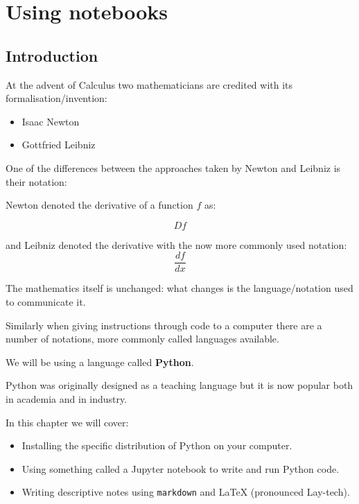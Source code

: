 \chapter{Using notebooks}
\label{\detokenize{tools-for-mathematics/01-using-notebooks/introduction/main:using-notebooks}}\label{\detokenize{tools-for-mathematics/01-using-notebooks/introduction/main:id1}}\label{\detokenize{tools-for-mathematics/01-using-notebooks/introduction/main::doc}}

\section{Introduction}
At the advent of Calculus two mathematicians are credited with its
formalisation/invention:
\begin{itemize}
\item Isaac Newton
\item Gottfried Leibniz
\end{itemize}

One of the differences between the approaches taken by Newton and Leibniz is
their notation:

Newton denoted the derivative of a function \(f\) as:

\begin{equation*}
Df
\end{equation*}

and Leibniz denoted the derivative with the now more commonly used notation:
\begin{equation*}
\frac{df}{dx}
\end{equation*}

The mathematics itself is unchanged: what changes is the language/notation used
to communicate it.

Similarly when giving instructions through code to a computer there are a number
of notations, more commonly called languages available.

We will be using a language called \textbf{Python}.

Python was originally designed as a teaching language but it is now popular both
in academia and in industry.

In this chapter we will cover:
\begin{itemize}
\item 
Installing the specific distribution of Python on your computer.

\item 
Using something called a Jupyter notebook to write and run Python code.

\item Writing descriptive notes using \texttt{markdown} and \LaTeX\; (pronounced
    Lay-tech).

\end{itemize}

